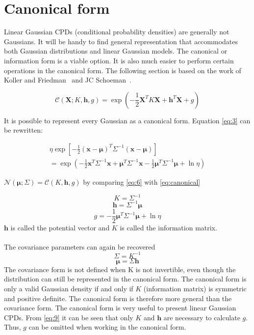 \documentclass[12pt,oneside,openany,a4paper, %
afrikaans,english,
]{memoir}
\numberwithin{equation}{chapter}
\begin{document}
\section{Canonical form}
Linear Gaussian CPDs (conditional probability densities) are generally not Gaussians. It will be handy to find general representation that accommodates both Gaussian distributions and linear Gaussian models. The canonical or information form is a viable option. It is also much easier to perform certain operations in the canonical form. The following section is based on the work of Koller and Friedman~\cite{koller} and JC Schoeman~\citep{JC}.

\begin{equation}\label{eq:canonical}
\mathcal{C}(\bm{X}; K,\bm{h},g) = \exp\left(-\frac{1}{2}\bm{X}^TK\bm{X} + \bm{h}^T\bm{X} +g \right)
\end{equation}


It is possible to represent every Gaussian as a canonical form. Equation \ref{eq:3} can be rewritten:


\begin{multline}\label{eq:6}
\eta\exp\left[-\frac{1}{2}(\bm{x}-\bm{\mu})^T\Sigma^{-1}(\bm{x}-\bm{\mu})\right]
\\ = \exp\left(-\frac{1}{2}\bm{x}^T\Sigma^{-1}\bm{x} + \bm{\mu}^T\Sigma^{-1}\bm{x} - \frac{1}{2}\bm{\mu}^T\Sigma^{-1}\bm{\mu} + \ln{\eta}\right)
\end{multline}


$\mathcal{N}(\bm{\mu}; \Sigma) = \mathcal{C}(K,\bm{h}, g)$ by comparing \ref{eq:6} with \ref{eq:canonical}

\begin{equation}\label{eq:7}
K = \Sigma^{-1}
\end{equation}
\begin{equation}\label{eq:8}
\bm{h} = \Sigma^{-1}\bm{\mu}
\end{equation}
\begin{equation}\label{eq:9}
g = - \frac{1}{2}\bm{\mu}^T\Sigma^{-1}\bm{\mu} + \ln{\eta}
\end{equation}
$\bm{h}$ is called the potential vector and $K$ is called the information matrix.\\\\
The covariance parameters can again be recovered
\begin{equation}
\Sigma = K^{-1}
\end{equation}
\begin{equation}
\bm{\mu} = \Sigma\bm{h}
\end{equation}
The covariance form is not defined when K is not invertible, even though the distribution can still be represented in the canonical form. The canonical form is only a valid Gaussian density if and only if $K$ (information matrix) is symmetric and positive definite. The canonical form is therefore more general than the covariance form. The canonical form is very useful to present linear Gaussian CPDs. From \ref{eq:9} it can be seen that only $K$ and $\bm{h}$ are necessary to calculate $g$. Thus, $g$ can be omitted when working in the canonical form. \\
\end{document}
